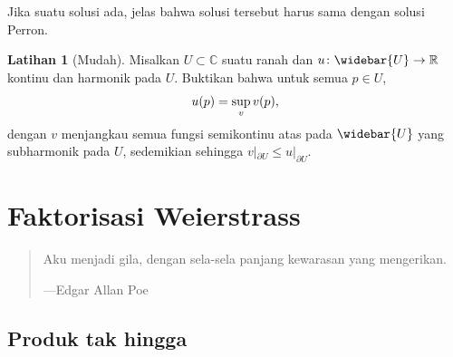 \documentclass[12pt,openany]{book}
\newcommand{\avoidbreak}{\postdisplaypenalty=100}
\newcommand{\C}{{\mathbb{C}}}
\newcommand{\R}{{\mathbb{R}}}
\theoremstyle{plain}
\theoremstyle{remark}
\theoremstyle{definition}
\newenvironment{exbox}{%
    \def\FrameCommand{\vrule width 1pt \relax\hspace{10pt}}%
    \MakeFramed{\advance\hsize-\width\FrameRestore}%
}{%
    \endMakeFramed
}
\newenvironment{myepigraph}{%
    \begin{quote}%
    \begingroup\itshape
}{%
    \endgroup%
    \end{quote}
}
\theoremstyle{exercise}
\newtheorem{exercise}{Latihan}[section]
\theoremstyle{example}
\begin{document}
Jika suatu solusi ada, jelas bahwa solusi tersebut harus sama dengan solusi Perron.

\begin{exbox}
\begin{exercise}[Mudah]
\pagebreak[2]
Misalkan $U \subset \C$ suatu ranah dan
$u \colon \widebar{U} \to \R$ kontinu dan
harmonik pada $U$.  Buktikan bahwa untuk semua $p \in U$,
\begin{equation*}
u(p) = \sup_{v} v(p),
\avoidbreak
\end{equation*}
dengan $v$ menjangkau semua fungsi semikontinu atas pada $\widebar{U}$
yang subharmonik pada $U$,
sedemikian sehingga $v|_{\partial U} \leq u|_{\partial U}$.
\end{exercise}
\end{exbox}


\let\LeblSavedClearpage\clearpage
\let\clearpage\relax
\chapter{Faktorisasi Weierstrass} \label{ch:weier}
\let\clearpage\LeblSavedClearpage

\begin{myepigraph}
Aku menjadi gila, dengan sela-sela panjang kewarasan yang mengerikan.

---Edgar Allan Poe
\end{myepigraph}


\section{Produk tak hingga}
\label{sec:prod}
\end{document}
